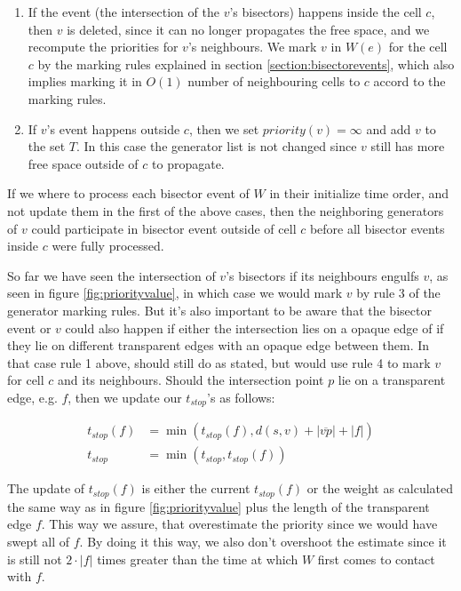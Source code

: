 \begin{enumerate}
    \item  If the event (the intersection of the $v$'s bisectors) happens inside the cell $c$, then $v$ is deleted, since it can no 
           longer propagates the free space, and we recompute the priorities for $v$'s neighbours. We mark $v$ in $W(e)$ for the cell 
           $c$ by the marking rules explained in section \ref{section:bisectorevents}, which also implies marking it in $O(1)$ number 
           of neighbouring cells to $c$ accord to the marking rules.
    \item If $v$'s event happens outside $c$, then we set $priority(v) = \infty$ and add $v$ to the set $T$. In this case the generator
          list is not changed since $v$ still has more free space outside of $c$ to propagate.
\end{enumerate}

If we where to process each bisector event of $W$ in their initialize time order, and not update them in the first of the above cases, 
then the neighboring generators of $v$ could participate in bisector event outside of cell $c$ before all bisector events inside $c$ 
were fully processed. 

So far we have seen the intersection of $v$'s bisectors if its neighbours engulfs $v$, as seen in figure \ref{fig:priorityvalue}, in 
which case we would mark $v$ by rule 3 of the generator marking rules. But it's also important to be aware that the bisector event or 
$v$ could also happen if either the intersection lies on a opaque edge of if they lie on different transparent edges with an opaque 
edge between them. In that case rule 1 above, should still do as stated, but would use rule 4 to mark $v$ for cell $c$ and its 
neighbours. Should the intersection point $p$ lie on a transparent edge, e.g. $f$, then we update our $t_{stop}$'s as follows:

\begin{align*}
    t_{stop}(f) &= \min(t_{stop}(f), d(s,v) + |\overline{vp}| + |f|) \\
    t_{stop}    &= \min(t_{stop}, t_{stop}(f))
\end{align*}

The update of $t_{stop}(f)$ is either the current $t_{stop}(f)$ or the weight as calculated the same way as in figure 
\ref{fig:priorityvalue} plus the length of the transparent edge $f$. This way we assure, that overestimate the priority 
since we would have swept all of $f$. By doing it this way, we also don't overshoot the estimate since it is still not 
$2\cdot|f|$ times greater than the time at which $W$ first comes to contact with $f$.

